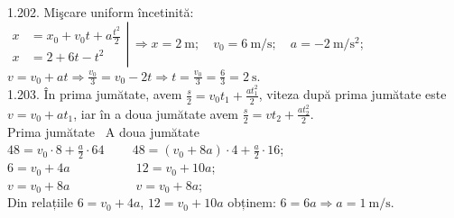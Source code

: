 1.202. Mişcare uniform încetinită:\\ $\left.\begin{aligned} x & =x_{0}+v_{0} t+a \frac{t^{2}}{2} \\ x & =2+6 t-t^{2}\end{aligned} \right\rvert\, \Rightarrow x=2 \mathrm{~m}; \quad v_{0}=6 \mathrm{~m} / \mathrm{s}; \quad a=-2 \mathrm{~m} / \mathrm{s}^{2}$;\\ $v=v_{0}+a t \Rightarrow \frac{v_{0}}{3}=v_{0}-2 t \Rightarrow t=\frac{v_{0}}{3}=\frac{6}{3}=2 \mathrm{~s}$.\\

1.203. În prima jumătate, avem $\frac{s}{2}=v_{0} t_{1}+\frac{a t_{1}^{2}}{2}$, viteza după prima jumătate este $v=v_{0}+a t_{1}$, iar în a doua jumătate avem $\frac{s}{2}=v t_{2}+\frac{a t_{2}^{2}}{2}$.\\ Prima jumătate \quad \quad \quad \ A doua jumătate\\ $48=v_{0} \cdot 8+\frac{a}{2} \cdot 64 \quad \quad \ 48=\left(v_{0}+8 a\right) \cdot 4+\frac{a}{2} \cdot 16$;\\ $6=v_{0}+4 a \quad \quad \quad \quad \quad \ 12=v_{0}+10 a$;\\ $v=v_{0}+8 a \quad \quad \quad \quad \quad \ v=v_{0}+8 a$;\\ Din relațiile $6=v_{0}+4 a$, $12=v_{0}+10 a$ obținem: $6=6a \Rightarrow a=1 \mathrm{~m} / \mathrm{s}$.\\

